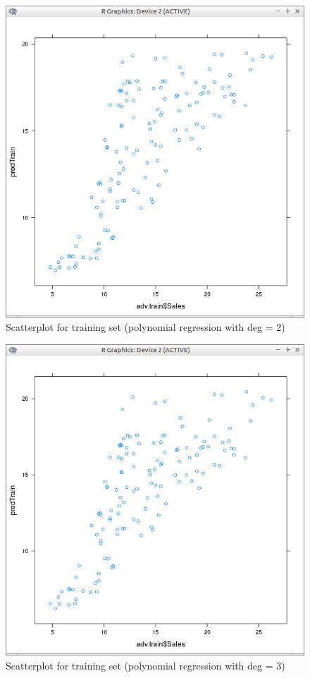 \documentclass[10pt,a4paper]{article}
\begin{document}
\begin{figure}[H]
\centering
\includegraphics[width=140mm]{figures2/pltTr2.png}
\caption{Scatterplot for training set (polynomial regression with deg = 2) \label{overflow}}
\end{figure}

\begin{figure}[H]
\centering
\includegraphics[width=140mm]{figures2/pltTr3.png}
\caption{Scatterplot for training set (polynomial regression with deg = 3) \label{overflow}}
\end{figure}
\end{document}

